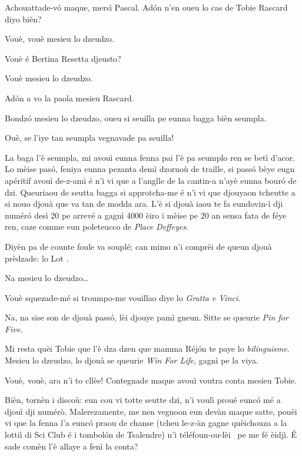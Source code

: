 \begin{drama}
\DzeudzoSenliquerspeaks {} A\-chou\-at\-ta\-de-v\'o ma\-que, mersì Pascal. Adón n'en oueu lo cas de Tobie Rascard  diyo bièn?

\Tobiespeaks Vouè, vouè mesieu lo dzeudzo.

\DzeudzoSenliquerspeaks Vouè é Bertina Resetta djeusto?

\Bertinaspeaks Vouè mesieu lo dzeudzo.

\DzeudzoSenliquerspeaks Adón a vo la paola mesieu Rascard.

\Tobiespeaks Bondzó mesieu lo dzeudzo, oueu si seuilla pe eunna bagga bièn seumpla.

\DzeudzoSenliquerspeaks Ouè, se l'iye tan seumpla vegnavade pa seuilla!

\Tobiespeaks La baga l'è seumpla, mi avouì eunna fenna pai l'è pa seumplo ren se betì d'acor. Lo mèise pas\'o, feniya eunna pezanta demì dzornoù de traille, si passó bèye eugn apéritif avouì de-z-amì é n’i vi que a l’anglle de la cantin-a n’ayè eunna bour\'o de dzi. Queuriaou de seutta bagga si approtcha-me é n’i vi que djouyaon tcheutte a si nouo djouà que va tan de modda ara. L’è si djouà iaou te fa eundovin-ì dji numéró desì 20 pe arrevé a gagnì 4000 èiro i mèise pe 20 an sensa fata de féye ren, caze comme eun poleteucco de \textit{Place Deffeyes}.

\DzeudzoSenliquerspeaks Diyèn pa de counte foule va souplé; can mimo n’i comprèi de queun djouà prèdzade: lo Lot \lotto.

\Tobiespeaks Na mesieu lo dzeudzo\ldots

\DzeudzoSenliquerspeaks Vouè squezade-mé si troumpo-me vouillao diye lo \textit{Gratta e Vinci}.

\Tobiespeaks Na, na sise son de djouà passó, lèi djouye pamì gneun. Sitte se queurie \textit{Pin for Five}.

\Bertinaspeaks Mi resta quèi Tobie que l’è dza dzen que mamma Réjón te paye lo \textit{bilinguisme}.  Mesieu lo dzeudzo, lo djouà se queurie \textit{Win For Life}, gagnì pe la viya.

\DzeudzoSenliquerspeaks Vouè, vouè, ara n’i to cllèe! Contegnade maque avouì voutra conta mesieu Tobie.

\Tobiespeaks Bièn, tornèn i discoù: eun cou vi totte seutte dzi, n’i voulì proué eunc\'o mé a djouì  dji numérò. Malerezamente, me nen vegnoon eun devàn maque satte, pouèi vi que la fenna l'a eunc\'o praou de chanse (tcheu le-z-àn gagne quèichouza a la lottiì di Sci Club é i tombol\'on de Tsalendre) n’i téléfoun-ou-lèi \chiamare\ pe me fé èidjì. É sade comèn l’è allaye a fenì la conta?


\end{drama}
